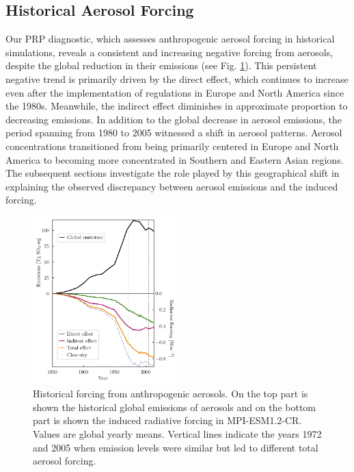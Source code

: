 \documentclass[draft]{agujournal2019}
\begin{document}
      \subsection{Historical Aerosol Forcing}
            Our PRP diagnostic, which assesses anthropogenic aerosol forcing in historical simulations, reveals a consistent and increasing negative forcing from aerosols, despite the global reduction in their emissions (see Fig. \ref{fig:figure1}). This persistent negative trend is primarily driven by the direct effect, which continues to increase even after the implementation of regulations in Europe and North America since the 1980s. Meanwhile, the indirect effect diminishes in approximate proportion to decreasing emissions.
            In addition to the global decrease in aerosol emissions, the period spanning from 1980 to 2005 witnessed a shift in aerosol patterns. Aerosol concentrations transitioned from being primarily centered in Europe and North America to becoming more concentrated in Southern and Eastern Asian regions.
            The subsequent sections investigate the role played by this geographical shift in explaining the observed discrepancy between aerosol emissions and the induced forcing.

      \begin{figure}
            \centering
            \noindent\includegraphics[width=0.5\textwidth]{../../figures/figure1}
            \caption{Historical forcing from anthropogenic aerosols. On the top part is shown the historical global emissions of aerosols and on the bottom part is shown the induced radiative forcing in MPI-ESM1.2-CR. Values are global yearly means. Vertical lines indicate the years 1972 and 2005 when emission levels were similar but led to different total aerosol forcing.}
            \label{fig:figure1}
      \end{figure}
\end{document}
